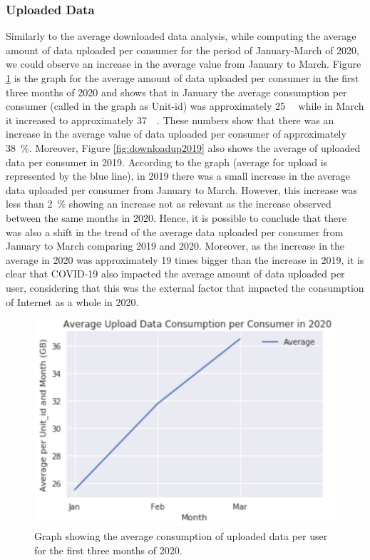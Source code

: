 \documentclass[conference]{IEEEtran}
\begin{document}
\subsubsection{Uploaded Data}
\label{sec:upload-data-consumption}

Similarly to the average downloaded data analysis, while computing the average amount of data uploaded per consumer for the period of January-March of 2020, we could observe an increase in the average value from January to March. Figure \ref{fig:upload2020} is the graph for the average amount of data uploaded per consumer in the first three months of 2020 and shows that in January the average consumption per consumer (called in the graph as Unit-id) was approximately \SI{25}{\giga\byte} while in March it increased to approximately \SI{37}{\giga\byte}. These numbers show that there was an increase in the average value of data uploaded per consumer of approximately \SI{38}{\percent}. Moreover, Figure \ref{fig:downloadup2019} also shows the average of uploaded data per consumer in 2019. According to the graph (average for upload is represented by the blue line), in 2019 there was a small increase in the average data uploaded per consumer from January to March. However, this increase was less than \SI{2}{\percent} showing an increase not as relevant as the increase observed between the same months in 2020. Hence, it is possible to conclude that there was also a shift in the trend of the average data uploaded per consumer from January to March comparing 2019 and 2020. Moreover, as the increase in the average in 2020 was approximately 19 times bigger than the increase in 2019, it is clear that COVID-19 also impacted the average amount of data uploaded per user, considering that this was the external factor that impacted the consumption of Internet as a whole in 2020. 

\begin{figure}[h!]
\centering
\includegraphics[width=1.0\linewidth]{upload2020.PNG}
\caption{Graph showing the average consumption of uploaded data per user for the first three months of 2020.}
\label{fig:upload2020}
\end{figure}
\end{document}
